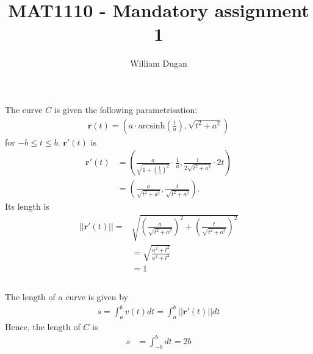 \documentclass[a4paper,10pt,english]{article}
\title{MAT1110 - Mandatory assignment 1}
\author{William Dugan}
\begin{document}
\maketitle

\section{}

\subsection{}
The curve $C$ is given the following parametrisation:
\begin{align}
    \bm{r}(t) = 
        \left( 
            a \cdot \text{arcsinh} \left( 
                                \frac{t}{a}
                            \right),
            \sqrt{t^2+a^2}
        \right)
\end{align}
for $-b \leq t \leq b$. $\bm{r}'(t)$ is
\begin{align*}
    \bm{r}'(t) 
    &= 
        \left( 
            \frac{a}{\sqrt{1 + {\left( \frac{t}{a} \right)}^2}} \cdot \frac{1}{a},
            \frac{1}{2\sqrt{t^2+a^2}} \cdot 2t
        \right) \\
    &= \left( 
            \frac{a}{\sqrt{t^2+a^2}},
            \frac{t}{\sqrt{t^2+a^2}}
        \right).
\end{align*}
Its length is
\begin{align*}
    ||\bm{r}'(t)||
    =& 
        \sqrt{
            \left(
                \frac{a}{\sqrt{t^2+a^2}}
            \right)^2
            +
            \left(
                \frac{t}{\sqrt{t^2+a^2}}
            \right)^2
        } \\
    &= 
        \sqrt{
            \frac{a^2+t^2}{a^2+t^2}
        } \\
    &= 1
\end{align*}

\subsection{}
The length of a curve is given by
\begin{align}
    s = \int_a^b v(t) dt = \int_a^b ||\bm{r}'(t)|| dt
\end{align}
Hence, the length of $C$ is
\begin{align*}
    s &= \int_{-b}^{b} dt = 2b
\end{align*}

\newpage
\end{document}
